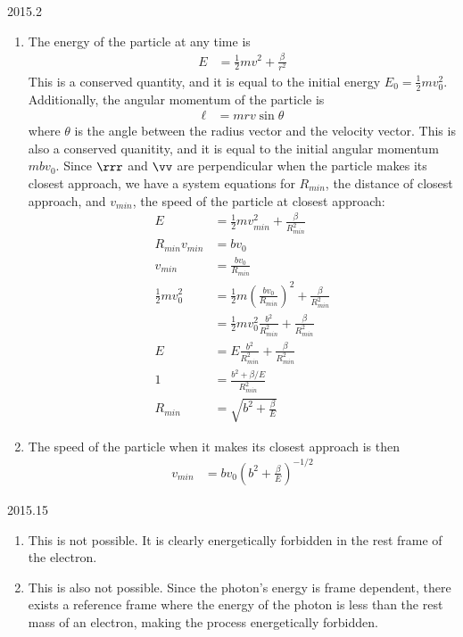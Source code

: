 \documentclass[12pt]{article}
\begin{document}
\begin{solution}{2015.2}
\begin{enumerate}
\item
The energy of the particle at any time is 
\begin{align*}
E & = \frac{1}{2} m v^2 + \frac{\beta}{r^2}
\end{align*}
This is a conserved quantity, and it is equal to the initial energy $E_0 = \frac{1}{2} m v_0^2$.
Additionally, the angular momentum of the particle is
\begin{align*}
\ell & = mrv \sin \theta
\end{align*}
where $\theta$ is the angle between the radius vector and the velocity vector.
This is also a conserved quanitity, and it is equal to the initial angular momentum $mbv_0$.
Since $\rrr$ and $\vv$ are perpendicular when the particle makes its closest approach, we have a system equations for $R_{min}$, the distance of closest approach, and $v_{min}$, the speed of the particle at closest approach:
\begin{align*}
E & = \frac{1}{2} mv_{min}^2 + \frac{\beta}{R_{min}^2} \\
R_{min} v_{min} & = b v_0 \\
v_{min} & = \frac{bv_0}{R_{min}} \\
\frac{1}{2} mv_0^2 & = \frac{1}{2} m \left( \frac{bv_0}{R_{min}} \right)^2 + \frac{\beta}{R_{min}^2} \\
& = \frac{1}{2} m v_0^2 \frac{b^2}{R_{min}^2} + \frac{\beta}{R_{min}^2} \\
E & = E \frac{b^2}{R_{min}^2} + \frac{\beta}{R_{min}^2} \\
1 & = \frac{b^2 + \beta/E}{R_{min}^2} \\
R_{min} & = \sqrt{b^2 + \frac{\beta}{E}}
\end{align*}

\item
The speed of the particle when it makes its closest approach is then
\begin{align*}
v_{min} & = bv_0 \left( b^2 + \frac{\beta}{E} \right)^{-1/2}
\end{align*}



\end{enumerate}

\end{solution}



\begin{solution}{2015.15}
\begin{enumerate}
\item
This is not possible. It is clearly energetically forbidden in the rest frame of the electron.

\item
This is also not possible. Since the photon's energy is frame dependent, there exists a reference frame where the energy of the photon is less than the rest mass of an electron, making the process energetically forbidden.

\end{enumerate}

\end{solution}
\end{document}
